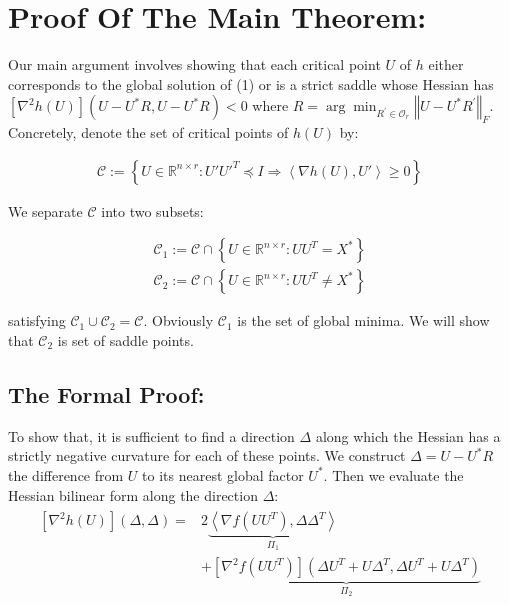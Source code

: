 \documentclass{article}
\begin{document}
\section{Proof Of The Main Theorem:}

Our main argument involves showing that each critical point $U$ of $h$ either corresponds to the global solution of (1) or is a strict saddle whose Hessian has $\left[\nabla^2 h\left(U\right)\right]\left(U-U^*R,U-U^*R\right) < 0$ where $R=\arg\min_{R^{'}\in\mathcal{O}_r}\left\Vert U-U^*R^{'}\right\Vert_F$. Concretely, denote the set of critical points of $h\left(U\right)$ by:

\begin{align*}
    \mathcal{C}:=\left\{U\in\mathbb{R}^{n\times r}:U'{U'}^T\preceq I\Rightarrow \left<\nabla h\left(U\right),U'\right>\ge0\right\}
\end{align*}

We separate $\mathcal{C}$ into two subsets:

\begin{align*}
    \mathcal{C}_1:=\mathcal{C} \cap \left\{U\in\mathbb{R}^{n\times r}:UU^T=X^*\right\}\\
    \mathcal{C}_2:=\mathcal{C} \cap \left\{U\in\mathbb{R}^{n\times r}:UU^T\ne X^*\right\}
\end{align*}

satisfying $\mathcal{C}_1\cup \mathcal{C}_2 = \mathcal{C}$. Obviously $\mathcal{C}_1$ is the set of global minima. We will show that $\mathcal{C}_2$ is set of saddle points.

\subsection{The Formal Proof:}

To show that, it is sufficient to find a direction $\Delta$ along which the Hessian has a strictly negative curvature for each of these points. We construct $\Delta = U-U^*R$ the difference from $U$ to its nearest global factor $U^*$. Then we evaluate the Hessian bilinear form along the direction $\Delta$:
\begin{align}\label{bilinear_form}
\begin{split}
    \left[\nabla^2h\left(U\right)\right]\left(\Delta,\Delta\right)= & 
    2\underbrace{\left<\nabla f\left(UU^T\right),\Delta\Delta^T\right>}_{\Pi_{1}}\\
    & +\underbrace{\left[\nabla^2 f\left(UU^T\right)\right]\left(\Delta U^T+U\Delta^T,\Delta U^T+U\Delta^T\right)}_{\Pi_{2}} 
\end{split}
\end{align}
\end{document}
